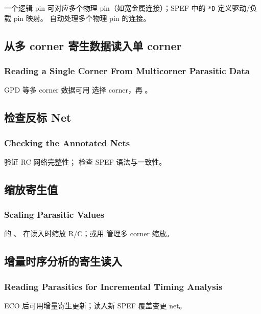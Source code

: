 一个逻辑 pin 可对应多个物理 pin（如宽金属连接）；SPEF 中的 \texttt{*D} 定义驱动/负载 pin 映射。 自动处理多个物理 pin 的连接。

\subsection{从多 corner 寄生数据读入单 corner}
\subsubsection*{Reading a Single Corner From Multicorner Parasitic Data}

GPD 等多 corner 数据可用  选择 corner，再 。

\subsection{检查反标 Net}
\subsubsection*{Checking the Annotated Nets}

 验证 RC 网络完整性； 检查 SPEF 语法与一致性。

\subsection{缩放寄生值}
\subsubsection*{Scaling Parasitic Values}

 的 、 在读入时缩放 R/C；或用  管理多 corner 缩放。

\subsection{增量时序分析的寄生读入}
\subsubsection*{Reading Parasitics for Incremental Timing Analysis}

ECO 后可用增量寄生更新；读入新 SPEF 覆盖变更 net。

